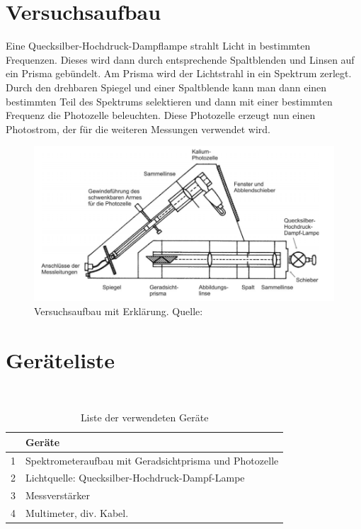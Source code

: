 \documentclass{article}
\begin{document}
\newpage


\section{Versuchsaufbau}

Eine Quecksilber-Hochdruck-Dampflampe strahlt Licht in bestimmten Frequenzen. Dieses wird dann durch entsprechende Spaltblenden und Linsen auf ein Prisma gebündelt. Am Prisma wird der Lichtstrahl in ein Spektrum zerlegt. Durch den drehbaren Spiegel und einer Spaltblende kann man dann einen bestimmten Teil des Spektrums selektieren und dann mit einer bestimmten Frequenz die Photozelle beleuchten. Diese Photozelle erzeugt nun einen Photostrom, der für die weiteren Messungen verwendet wird.

\begin{figure}[H]
\includegraphics[scale=1.6]{versuch2.png}
\caption{Versuchsaufbau mit Erklärung. Quelle: \cite{moodle}}
\label{fig:versuch2}
\end{figure}


\section{Geräteliste}


\begin{table}[H]
\caption{Liste der verwendeten Geräte}
~
\begin{tabular}{l|l}
 & Geräte  \\
\hline
1 & Spektrometeraufbau mit Geradsichtprisma und Photozelle  \\
2 & Lichtquelle: Quecksilber-Hochdruck-Dampf-Lampe  \\
3 & Messverstärker \\
4 &  Multimeter, div. Kabel.
\end{tabular}

\end{table}
\end{document}
